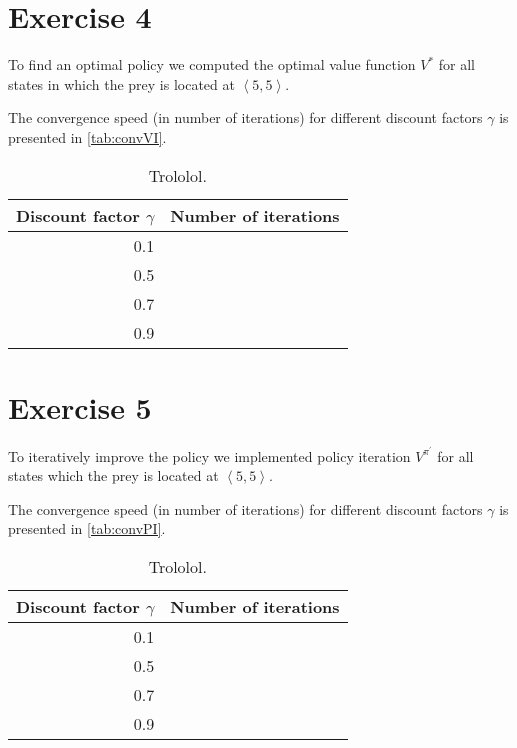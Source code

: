 \documentclass[a4paper,11pt]{article}
\begin{document}
\section*{Exercise 4}
To find an optimal policy we computed the optimal value function $V^\ast$ for all states in which the prey is located at $\left<5,5\right>$.

The convergence speed (in number of iterations) for different discount factors $\gamma$ is presented in \autoref{tab:convVI}.
\begin{table}
\caption{Trololol.}
\label{tab:convVI}
\begin{center}
\begin{tabular}{|@{ }r@{ }|@{ }r@{ }|}
\hline
Discount factor $\gamma$ & Number of iterations \\
           \hline
0.1 & \\
0.5 & \\
0.7 & \\
0.9 & \\
\hline
\end{tabular}
\end{center}
\end{table}

\section*{Exercise 5}
To iteratively improve the policy we implemented policy iteration $V^{\pi^\prime}$ for all states which the prey is located at $\left<5,5\right>$.

The convergence speed (in number of iterations) for different discount factors $\gamma$ is presented in \autoref{tab:convPI}.
\begin{table}
\caption{Trololol.}
\label{tab:convPI}
\begin{center}
\begin{tabular}{|@{ }r@{ }|@{ }r@{ }|}
\hline
Discount factor $\gamma$ & Number of iterations \\
\hline
0.1 & \\
0.5 & \\
0.7 & \\
0.9 & \\
\hline
\end{tabular}
\end{center}
\end{table}

\end{document}
